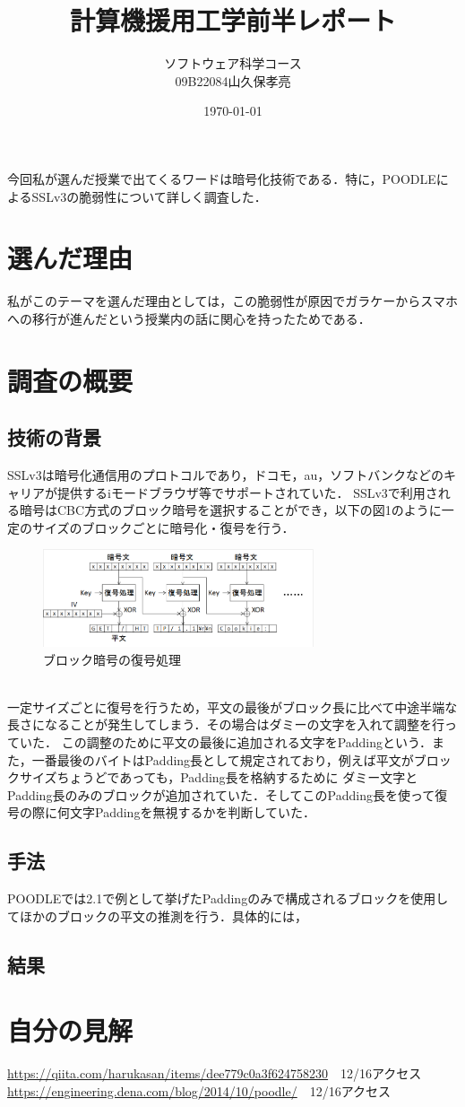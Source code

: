 \documentclass[dvipdfmx]{jarticle}
\title{計算機援用工学前半レポート}
\author{ソフトウェア科学コース\\09B22084山久保孝亮}
\date{\today}
\begin{document}
\maketitle
今回私が選んだ授業で出てくるワードは暗号化技術である．特に，POODLEによるSSLv3の脆弱性について詳しく調査した．
\section{選んだ理由}
私がこのテーマを選んだ理由としては，この脆弱性が原因でガラケーからスマホへの移行が進んだという授業内の話に関心を持ったためである．
\section{調査の概要}
\subsection{技術の背景}
SSLv3は暗号化通信用のプロトコルであり，ドコモ，au，ソフトバンクなどのキャリアが提供するiモードブラウザ等でサポートされていた．\cite{0}
SSLv3で利用される暗号はCBC方式のブロック暗号を選択することができ，以下の図1のように一定のサイズのブロックごとに暗号化・復号を行う．
\begin{figure}[h]
    \centering
    \includegraphics[width = 8cm]{CBC.png}
    \caption{ブロック暗号の復号処理}
\end{figure}
\\一定サイズごとに復号を行うため，平文の最後がブロック長に比べて中途半端な長さになることが発生してしまう．その場合はダミーの文字を入れて調整を行っていた．
この調整のために平文の最後に追加される文字をPaddingという．また，一番最後のバイトはPadding長として規定されており，例えば平文がブロックサイズちょうどであっても，Padding長を格納するために
ダミー文字とPadding長のみのブロックが追加されていた．そしてこのPadding長を使って復号の際に何文字Paddingを無視するかを判断していた．
\subsection{手法}
POODLEでは2.1で例として挙げたPaddingのみで構成されるブロックを使用してほかのブロックの平文の推測を行う．具体的には，
\subsection{結果}

\section{自分の見解}

\begin{thebibliography}{99}
     \url{https://qiita.com/harukasan/items/dee779c0a3f624758230}　12/16アクセス
     \url{https://engineering.dena.com/blog/2014/10/poodle/}　12/16アクセス
\end{thebibliography}
\end{document}
